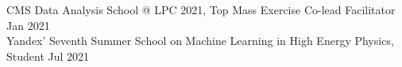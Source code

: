  




CMS Data Analysis School @ LPC 2021, Top Mass Exercise Co-lead Facilitator \hfill Jan 2021 \\
Yandex' Seventh Summer School on Machine Learning in High Energy Physics, Student \hfill Jul 2021 \\
